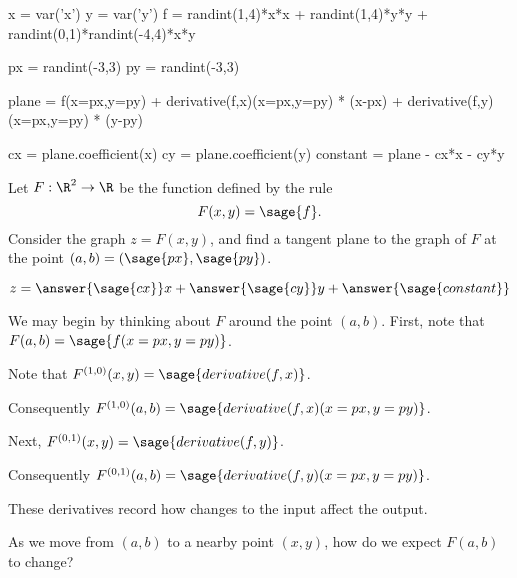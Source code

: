 \documentclass{ximera}
\author{Jim Fowler}
\begin{document}
\makerandom
\begin{sagesilent}
x = var('x')
y = var('y')
f = randint(1,4)*x*x + randint(1,4)*y*y + randint(0,1)*randint(-4,4)*x*y

px = randint(-3,3)
py = randint(-3,3)

plane = f(x=px,y=py) + derivative(f,x)(x=px,y=py) * (x-px) +   derivative(f,y)(x=px,y=py) * (y-py)

cx = plane.coefficient(x)
cy = plane.coefficient(y)
constant = plane - cx*x - cy*y
  
\end{sagesilent}

\begin{exercise}

  Let $F : \R^2 \to \R$ be the function defined by the rule
  \[
    F(x,y) = \sage{f}.
  \]
  Consider the graph $z = F(x,y)$, and find a tangent plane to the
  graph of $F$ at the point $(a,b) = (\sage{px},\sage{py})$.

  \begin{prompt}
    \[
      z = \answer{\sage{cx}} x + \answer{\sage{cy}} y + \answer{\sage{constant}}
    \]
  \end{prompt}

  \begin{hint}
    We may begin by thinking about $F$ around the point $(a,b)$.  First, note that $F(a,b) = \sage{f(x=px,y=py)}$.
  \end{hint}

  \begin{hint}
    Note that $F^{(1,0)}(x,y) = \sage{derivative(f,x)}$.
  \end{hint}

  \begin{hint}
    Consequently $F^{(1,0)}(a,b) = \sage{derivative(f,x)(x=px,y=py)}$.
  \end{hint}  

  \begin{hint}
    Next, $F^{(0,1)}(x,y) = \sage{derivative(f,y)}$.
  \end{hint}

  \begin{hint}
    Consequently $F^{(0,1)}(a,b) = \sage{derivative(f,y)(x=px,y=py)}$.
  \end{hint}

  \begin{hint}
    These derivatives record how changes to the input affect the output.
  \end{hint}

  \begin{hint}
    As we move from $(a,b)$ to a nearby point $(x,y)$, how do we expect $F(a,b)$ to change?
  \end{hint}


\end{exercise}
\end{document}
